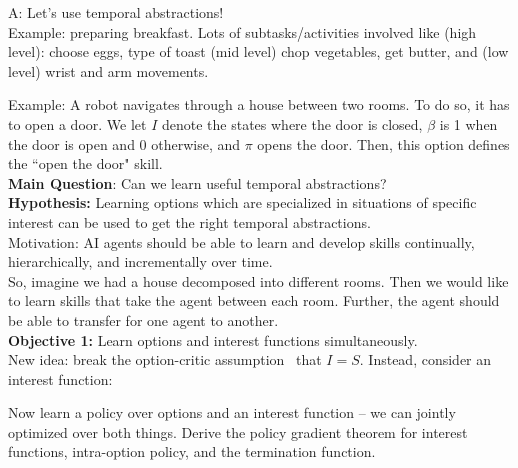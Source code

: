 A: Let's use temporal abstractions! \\

Example: preparing breakfast. Lots of subtasks/activities involved like (high level): choose eggs, type of toast (mid level) chop vegetables, get butter, and (low level) wrist and arm movements. \\


Example: A robot navigates through a house between two rooms. To do so, it has to open a door. We let $I$ denote the states where the door is closed, $\beta$ is 1 when the door is open and 0 otherwise, and $\pi$ opens the door. Then, this option defines the ``open the door" skill. \\

{\bf Main Question}: Can we learn useful temporal abstractions? \\

{\bf Hypothesis:} Learning options which are specialized in situations of specific interest can be used to get the right temporal abstractions. \\

Motivation: AI agents should be able to learn and develop skills continually, hierarchically, and incrementally over time. \\

So, imagine we had a house decomposed into different rooms. Then we would like to learn skills that take the agent between each room. Further, the agent should be able to transfer for one agent to another. \\

{\bf Objective 1:} Learn options and interest functions simultaneously. \\

New idea: break the option-critic assumption~\cite{bacon2017option} that $I = S$. Instead, consider an interest function:

Now learn a policy over options and an interest function -- we can jointly optimized over both things. Derive the policy gradient theorem for interest functions, intra-option policy, and the termination function. \\

